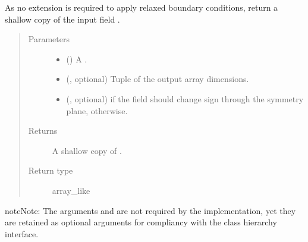 \documentclass[letterpaper,10pt,english]{sphinxmanual}
\begin{document}
\begin{fulllineitems}

\begin{fulllineitems}
\label{\detokenize{api:tasmania.dycore.horizontal_boundary_relaxed.Relaxed.from_computational_to_physical_domain}}
As no extension is required to apply relaxed boundary conditions, return a shallow copy of the
input field .
\begin{quote}\begin{description}
\item[{Parameters}] \leavevmode\begin{itemize}
\item {} 
 () \textendash{} A .

\item {} 
 (, optional) \textendash{} Tuple of the output array dimensions.

\item {} 
 (, optional) \textendash{}  if the field should change sign through the symmetry plane,  otherwise.

\end{itemize}

\item[{Returns}] \leavevmode
A shallow copy of .

\item[{Return type}] \leavevmode
array\_like

\end{description}\end{quote}

\begin{sphinxadmonition}{note}{Note:}
The arguments  and  are not required by the implementation,
yet they are retained as optional arguments for compliancy with the class hierarchy interface.
\end{sphinxadmonition}

\end{fulllineitems}


\end{fulllineitems}
\end{document}
